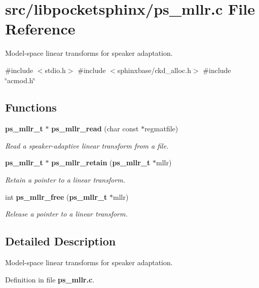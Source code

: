 \section{src/libpocketsphinx/ps\-\_\-mllr.c \-File \-Reference}
\label{ps__mllr_8c}


\-Model-\/space linear transforms for speaker adaptation.  


{\ttfamily \#include $<$stdio.\-h$>$}\*
{\ttfamily \#include $<$sphinxbase/ckd\-\_\-alloc.\-h$>$}\*
{\ttfamily \#include \char`\"{}acmod.\-h\char`\"{}}\*
\subsection*{\-Functions}
\begin{DoxyCompactItemize}
\item 
{\bf ps\-\_\-mllr\-\_\-t} $\ast$ {\bf ps\-\_\-mllr\-\_\-read} (char const $\ast$regmatfile)\label{ps__mllr_8c_ab62fb9c8cf3bdeed75a7ac2870d56a5a}

\begin{DoxyCompactList}\small\item\em \-Read a speaker-\/adaptive linear transform from a file. \end{DoxyCompactList}\item 
{\bf ps\-\_\-mllr\-\_\-t} $\ast$ {\bf ps\-\_\-mllr\-\_\-retain} ({\bf ps\-\_\-mllr\-\_\-t} $\ast$mllr)\label{ps__mllr_8c_ae21e7d8a0fa751aaccc5ef39dc5d1fe0}

\begin{DoxyCompactList}\small\item\em \-Retain a pointer to a linear transform. \end{DoxyCompactList}\item 
int {\bf ps\-\_\-mllr\-\_\-free} ({\bf ps\-\_\-mllr\-\_\-t} $\ast$mllr)\label{ps__mllr_8c_a240194a6ef30b01da38e3654c984b017}

\begin{DoxyCompactList}\small\item\em \-Release a pointer to a linear transform. \end{DoxyCompactList}\end{DoxyCompactItemize}


\subsection{\-Detailed \-Description}
\-Model-\/space linear transforms for speaker adaptation. 

\-Definition in file {\bf ps\-\_\-mllr.\-c}.

